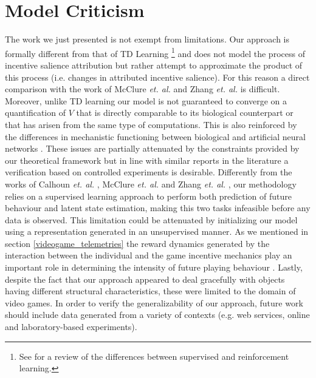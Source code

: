 \section{Model Criticism}
\label{model_criticism_3}
The work we just presented is not exempt from limitations. Our approach is formally different from that of TD Learning \footnote{See \cite{barto2004reinforcement} for a  review of the differences between supervised and reinforcement learning.} and does not model the process of incentive salience attribution but rather attempt to approximate the product of this process (i.e. changes in attributed incentive salience). For this reason a direct comparison with the work of McClure \textit{et. al.} \cite{mcclure2003computational} and Zhang \textit{et. al.} \cite{zhang2009neural} is difficult. Moreover, unlike TD learning \cite{schultz1997neural} our model is not guaranteed to converge on a quantification of $V$ that is directly comparable to its biological counterpart or that has arisen from the same type of computations. This is also reinforced by the differences in mechanistic functioning between biological and artificial neural networks \cite{lillicrap2019backpropagation,lillicrap2020backpropagation}. These issues are partially attenuated by the constraints provided by our theoretical framework but in line with similar reports in the literature \cite{calhoun2019unsupervised,wang2018prefrontal} a verification based on controlled experiments is desirable. Differently from the works of Calhoun \textit{et. al.} \cite{calhoun2019unsupervised},  McClure \textit{et. al.} \cite{mcclure2003computational} and Zhang \textit{et. al.} \cite{zhang2009neural}, our methodology relies on a  supervised learning approach to perform both prediction of future behaviour and latent state estimation, making this two tasks infeasible before any data is observed. This limitation could be attenuated by initializing our model using a representation  generated in an unsupervised manner. As we mentioned in section \ref{videogame_telemetries} the reward dynamics generated by the interaction between the individual and the game incentive mechanics play an important role in determining the intensity of future playing behaviour \cite{agarwal2017quitting, avserivskis2017computational, wang2018beyond}. Lastly, despite the fact that our approach appeared to deal gracefully  with objects having different structural characteristics, these were limited to the domain of video games. In order to verify the generalizability of our approach, future work should include data generated from a variety of contexts (e.g. web services, online and laboratory-based experiments).


